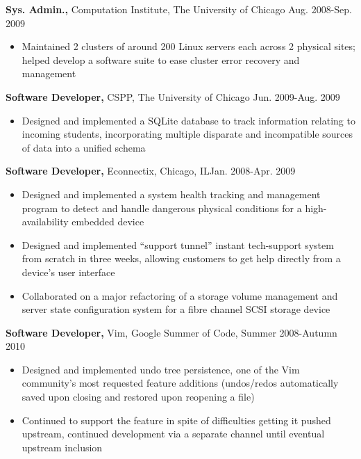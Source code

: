 \documentclass[line,overlapped]{res}
\begin{document}
\begin{resume}
{\bf Sys. Admin.,} Computation Institute, The University of Chicago \hfill Aug. 2008-Sep. 2009
\begin{itemize} \itemsep -2pt %
    \item Maintained 2 clusters of around 200 Linux servers each across 2 physical sites; helped develop a software suite to ease cluster error recovery and management
\end{itemize} \itemsep -2pt
\vspace{-10pt}
{\bf Software Developer,} CSPP, The University of Chicago \hfill Jun. 2009-Aug. 2009
\begin{itemize} \itemsep -2pt
    \item Designed and implemented a SQLite database to track information relating to incoming students, incorporating multiple disparate and incompatible sources of data into a unified schema
\end{itemize}
\vspace{-10pt}

{\bf Software Developer,} Econnectix, Chicago, IL\hfill Jan. 2008-Apr. 2009
\begin{itemize} \itemsep -2pt %
    \item Designed and implemented a system health tracking and management program to detect and handle dangerous physical conditions for a high-availability embedded device
    \item Designed and implemented ``support tunnel'' instant tech-support system from scratch in three weeks, allowing customers to get help directly from a device's user interface
    \item Collaborated on a major refactoring of a storage volume management and server state configuration system for a fibre channel SCSI storage device
\end{itemize}
\vspace{-10pt}

{\bf Software Developer,} Vim, Google Summer of Code, \hfill Summer 2008-Autumn 2010
\begin{itemize} \itemsep -2pt
    \item Designed and implemented undo tree persistence, one of the Vim community's most requested feature additions (undos/redos automatically saved upon closing and restored upon reopening a file)\footnotemark[2]
    \item Continued to support the feature in spite of difficulties getting it pushed upstream, continued development via a separate channel until eventual upstream inclusion
\end{itemize}


\end{resume}
\end{document}
